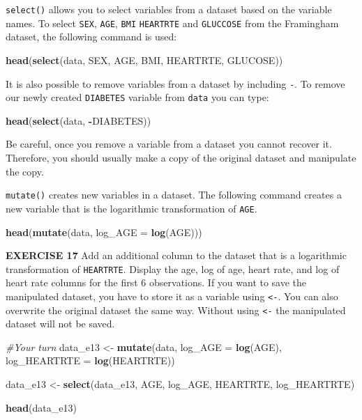 \documentclass[
]{article}
\newenvironment{Shaded}{\begin{snugshade}}{\end{snugshade}}
\newcommand{\CommentTok}[1]{\textcolor[rgb]{0.56,0.35,0.01}{\textit{#1}}}
\newcommand{\DataTypeTok}[1]{\textcolor[rgb]{0.13,0.29,0.53}{#1}}
\newcommand{\KeywordTok}[1]{\textcolor[rgb]{0.13,0.29,0.53}{\textbf{#1}}}
\newcommand{\NormalTok}[1]{#1}
\newcommand{\OperatorTok}[1]{\textcolor[rgb]{0.81,0.36,0.00}{\textbf{#1}}}
\newcommand{\StringTok}[1]{\textcolor[rgb]{0.31,0.60,0.02}{#1}}
\begin{document}
\texttt{select()} allows you to select variables from a dataset based on
the variable names. To select \texttt{SEX}, \texttt{AGE}, \texttt{BMI}
\texttt{HEARTRTE} and \texttt{GLUCCOSE} from the Framingham dataset, the
following command is used:

\begin{Shaded}
\begin{Highlighting}[]
\KeywordTok{head}\NormalTok{(}\KeywordTok{select}\NormalTok{(data, SEX, AGE, BMI, HEARTRTE, GLUCOSE))}
\end{Highlighting}
\end{Shaded}

It is also possible to remove variables from a dataset by including
\texttt{-}. To remove our newly created \texttt{DIABETES} variable from
\texttt{data} you can type:

\begin{Shaded}
\begin{Highlighting}[]
\KeywordTok{head}\NormalTok{(}\KeywordTok{select}\NormalTok{(data, }\OperatorTok{-}\NormalTok{DIABETES))}
\end{Highlighting}
\end{Shaded}

Be careful, once you remove a variable from a dataset you cannot recover
it. Therefore, you should usually make a copy of the original dataset
and manipulate the copy.

\texttt{mutate()} creates new variables in a dataset. The following
command creates a new variable that is the logarithmic transformation of
\texttt{AGE}.

\begin{Shaded}
\begin{Highlighting}[]
\KeywordTok{head}\NormalTok{(}\KeywordTok{mutate}\NormalTok{(data, }\DataTypeTok{log_AGE =} \KeywordTok{log}\NormalTok{(AGE)))}
\end{Highlighting}
\end{Shaded}

\textbf{EXERCISE 17} Add an additional column to the dataset that is a
logarithmic transformation of \texttt{HEARTRTE}. Display the age, log of
age, heart rate, and log of heart rate columns for the first 6
observations. If you want to save the manipulated dataset, you have to
store it as a variable using \texttt{\textless{}-}. You can also
overwrite the original dataset the same way. Without using
\texttt{\textless{}-} the manipulated dataset will not be saved.

\begin{Shaded}
\begin{Highlighting}[]
\CommentTok{#Your turn}
\NormalTok{data_e13 <-}\StringTok{ }\KeywordTok{mutate}\NormalTok{(data,}
                   \DataTypeTok{log_AGE =} \KeywordTok{log}\NormalTok{(AGE), }
                   \DataTypeTok{log_HEARTRTE =} \KeywordTok{log}\NormalTok{(HEARTRTE)) }

\NormalTok{data_e13 <-}\StringTok{ }\KeywordTok{select}\NormalTok{(data_e13, AGE, log_AGE, HEARTRTE, log_HEARTRTE)}

\KeywordTok{head}\NormalTok{(data_e13) }
\end{Highlighting}
\end{Shaded}
\end{document}
